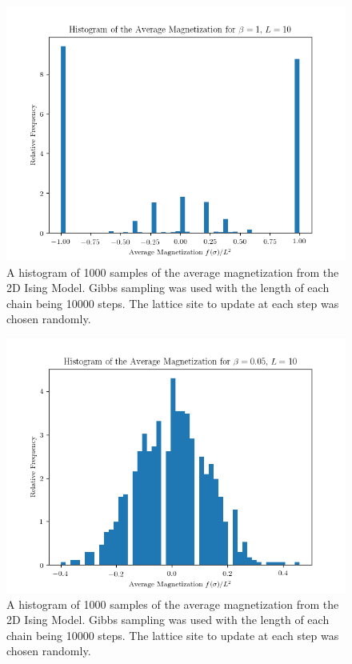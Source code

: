 \documentclass[11pt,a4paper]{amsart}
\begin{document}
\begin{figure}[H]
\centering
\includegraphics[width=5in]{maghistb1.png}
\caption{A histogram of 1000 samples of the average magnetization from the 2D Ising Model.  Gibbs sampling was used with the length of each chain being 10000 steps.  The lattice site to update at each step was chosen randomly.}
\label{fig:maghistb1}
\end{figure}

\begin{figure}[H]
\centering
\includegraphics[width=5in]{maghistb005.png}
\caption{A histogram of 1000 samples of the average magnetization from the 2D Ising Model.  Gibbs sampling was used with the length of each chain being 10000 steps.  The lattice site to update at each step was chosen randomly.}
\label{fig:maghistb005}
\end{figure}
\end{document}

